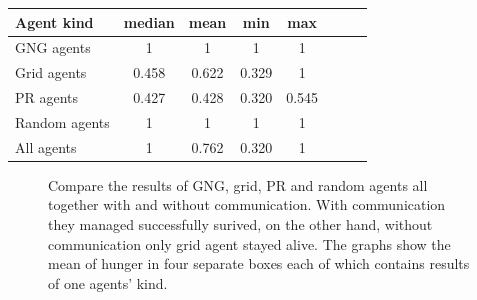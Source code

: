 \begin{center}
  \begin{tabular}{l*{6}{c}r}
  Agent kind        & median & mean & min & max \\
  \hline
  GNG agents        & 1 & 1 & 1 & 1  \\
  Grid agents       & 0.458 & 0.622 & 0.329 & 1  \\   
  PR agents         & 0.427 & 0.428 & 0.320 & 0.545 \\  
  Random agents     & 1 & 1 & 1 & 1  \\
  All agents        & 1 & 0.762 & 0.320 & 1  \\ 
  \end{tabular}                    
\end{center} 



\begin{figure}[h!]
  \centering        
  \caption{Compare the results of GNG, grid, PR and random agents all together with and without communication. With communication they managed successfully surived, on the other hand, without communication only grid agent stayed alive. The graphs show the mean of hunger in four separate boxes each of which contains results of one agents' kind.}
\end{figure}
       
